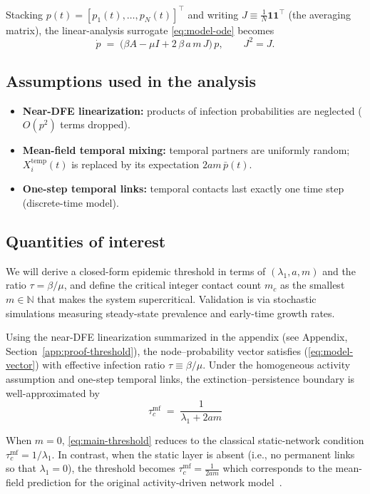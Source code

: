 \documentclass[pdflatex,sn-mathphys-num]{sn-jnl}%
\theoremstyle{thmstyleone}%
\theoremstyle{thmstyletwo}%
\theoremstyle{thmstylethree}%
\begin{document}
Stacking $p(t)=[p_1(t),\dots,p_N(t)]^\top$ and writing $J\equiv \tfrac{1}{N}\mathbf{1}\mathbf{1}^\top$
(the averaging matrix), the linear-analysis surrogate \eqref{eq:model-ode} becomes
\begin{equation}
\dot p \;=\; \big(\beta A - \mu I + 2\,\beta\,a\,m\,J\big)\,p,
\qquad J^2=J.
\label{eq:model-vector}
\end{equation}



\subsection{Assumptions used in the analysis}
\label{subsec:assumptions}
\begin{itemize}
  \item \textbf{Near-DFE linearization:} products of infection probabilities are neglected ($O(p^2)$ terms dropped).
  \item \textbf{Mean-field temporal mixing:} temporal partners are uniformly random; $X_i^{\mathrm{temp}}(t)$ is replaced by its expectation $2am\,\bar p(t)$.
  \item \textbf{One-step temporal links:} temporal contacts last exactly one time step (discrete-time model).
\end{itemize}

\subsection{Quantities of interest}
We will derive a closed-form epidemic threshold in terms of $(\lambda_1,a,m)$ and the ratio $\tau=\beta/\mu$, and define the critical integer contact count $m_c$ as the smallest $m\in\mathbb{N}$ that makes the system supercritical. Validation is via stochastic simulations measuring steady-state prevalence and early-time growth rates.



Using the near-DFE linearization summarized in the appendix (see Appendix, Section~\ref{app:proof-threshold}), the node–probability vector satisfies (\ref{eq:model-vector}) with effective infection ratio $\tau \equiv \beta/\mu$. Under the homogeneous activity assumption and one-step temporal links, the extinction–persistence boundary is well-approximated by
\begin{equation}
\boxed{\;\tau_c^{\text{mf}} \;=\; \frac{1}{\lambda_1 + 2 a m}\;}
\label{eq:main-threshold}
\end{equation}

\medskip
When $m=0$, \eqref{eq:main-threshold} reduces to the classical static-network condition $\tau_c^{\text{mf}}=1/\lambda_1$.
In contrast, when the static layer is absent (i.e., no permanent links so that $\lambda_1=0$), the threshold becomes $\tau_c^{\text{mf}} = \frac{1}{2 a m}$ which corresponds to the mean-field prediction for the original activity-driven network model~\cite{Perra2012}.
\end{document}
